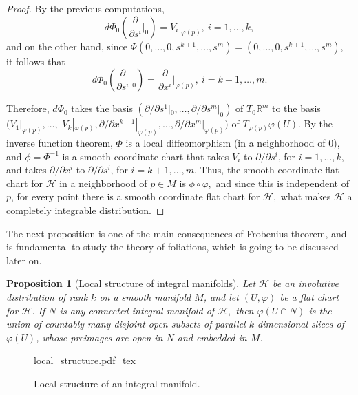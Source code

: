 \documentclass[12pt, letterpaper, reqno]{amsart}
\newcommand{\incfig}[2][1]{%
    \def\svgwidth{#1\columnwidth}
    {#2.pdf_tex}
}
\theoremstyle{definition}
\theoremstyle{plain}
\newtheorem{prop}{Proposition}
\theoremstyle{remark}
\begin{document}
\begin{proof}
	By the previous computations, $$ d\Phi_0\left( \frac{\partial}{\partial s^i}\Big|_{0} \right) = V_i |_{\varphi(p)}, \ i=1,\dots,k, $$ and on the other hand, since $ \Phi(0,\dots,0,s^{k+1},\dots,s^m)=(0,\dots,0,s^{k+1},\dots,s^m), $ it follows that
	$$ d\Phi_0 \left( \frac{\partial}{\partial s^i}\Big|_{0}  \right) = \frac{\partial}{\partial x^i}\Big|_{\varphi(p)},\ i=k+1,\dots,m.  $$ 
	
	Therefore, $ d\Phi_0 $ takes the basis $ \left( \partial/\partial s^1 |_0,\dots,\partial/\partial s^m |_0 \right) $ of $ T_0 \mathbb{R}^m $ to the basis $ ( V_1|_{\varphi(p)},  \dots,$ $ V_k|_{\varphi(p)}, \partial/\partial x^{k+1}|_{\varphi(p)}, \dots, \partial/\partial x^{m}|_{\varphi(p)}) $ of $ T_{\varphi(p)} \varphi(U). $ By the inverse function theorem, $ \Phi $ is a local diffeomorphism (in a neighborhood of $ 0 $), and $ \phi=\Phi^{-1} $ is a smooth coordinate chart that takes $ V_i $ to $ \partial/\partial s^i $, for $ i=1,\dots,k, $ and takes $ \partial / \partial x^{i} $ to $ \partial/\partial s^i $, for $ i=k+1,\dots,m. $ Thus, the smooth coordinate flat chart for $ \mathcal{H} $ in a neighborhood of $ p\in M $ is $ \phi\circ\varphi, $ and since this is independent of $ p $, for every point there is a smooth coordinate flat chart for $ \mathcal{H}, $ what makes $ \mathcal{H} $ a completely integrable distribution.

\end{proof}

The next proposition is one of the main consequences of Frobenius theorem, and is fundamental to study the theory of foliations, which is going to be discussed later on.
\begin{prop}[Local structure of integral manifolds]\label{prop:local_structure}
	Let $ \mathcal{H} $ be an involutive distribution of rank $ k $ on a smooth manifold $ M $, and let $ (U,\varphi) $ be a flat chart for $ \mathcal{H} $. If $ N $ is any connected integral manifold of $ \mathcal{H}, $ then $ \varphi(U\cap N) $ is the union of countably many disjoint open subsets of parallel $ k $-dimensional slices of $ \varphi(U) $, whose preimages are open in $ N $ and embedded in $ M $.
\end{prop}

\begin{figure}
    \centering
    \incfig{local_structure}
    \caption{Local structure of an integral manifold.}
    \label{fig:local_structure}
\end{figure}
\end{document}
